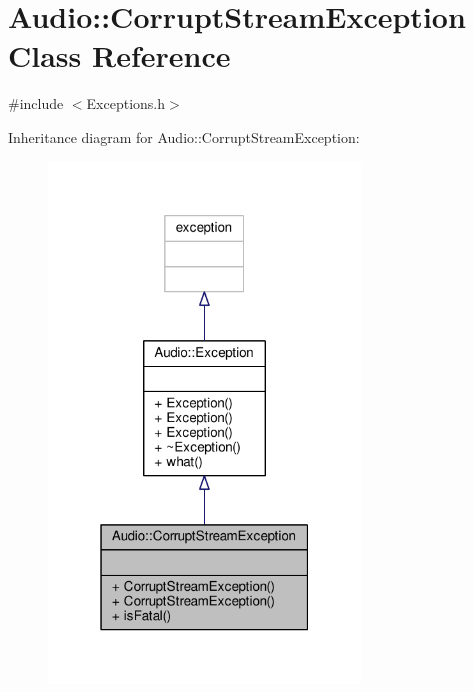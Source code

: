 \hypertarget{classAudio_1_1CorruptStreamException}{}\section{Audio\+:\+:Corrupt\+Stream\+Exception Class Reference}
\label{classAudio_1_1CorruptStreamException}


{\ttfamily \#include $<$Exceptions.\+h$>$}



Inheritance diagram for Audio\+:\+:Corrupt\+Stream\+Exception\+:
\nopagebreak
\begin{figure}[H]
\begin{center}
\leavevmode
\includegraphics[width=235pt]{dd/dfb/classAudio_1_1CorruptStreamException__inherit__graph}
\end{center}
\end{figure}


